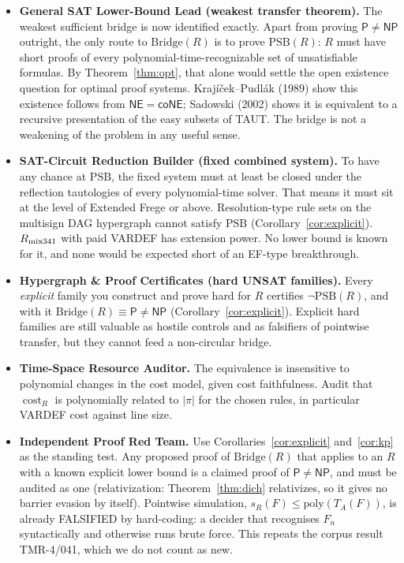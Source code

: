 \documentclass[11pt]{article}
\theoremstyle{definition}
\newcommand{\Pc}{\mathsf{P}}
\newcommand{\NP}{\mathsf{NP}}
\newcommand{\PSB}{\mathrm{PSB}}
\newcommand{\Bridge}{\mathrm{Bridge}}
\begin{document}
\begin{itemize}
\item \textbf{General SAT Lower-Bound Lead (weakest transfer theorem).}
The weakest sufficient bridge is now identified exactly. Apart from proving
$\Pc\ne\NP$ outright, the only route to $\Bridge(R)$ is to prove $\PSB(R)$:
$R$ must have short proofs of every polynomial-time-recognizable set of
unsatisfiable formulas. By Theorem~\ref{thm:opt}, that alone would settle the
open existence question for optimal proof systems. Krajíček--Pudlák (1989)
show this existence follows from $\mathsf{NE}=\mathsf{coNE}$; Sadowski (2002)
shows it is equivalent to a recursive presentation of the easy subsets of
TAUT. The bridge is not a weakening of the problem in any useful sense.
\item \textbf{SAT-Circuit Reduction Builder (fixed combined system).}
To have any chance at $\PSB$, the fixed system must at least be closed under the
reflection tautologies of every polynomial-time solver. That means it must sit
at the level of Extended Frege or above. Resolution-type rule sets on the
multisign DAG hypergraph cannot satisfy $\PSB$ (Corollary~\ref{cor:explicit}).
$R_{\rm mix341}$ with paid VARDEF has extension power. No lower bound is known
for it, and none would be expected short of an EF-type breakthrough.
\item \textbf{Hypergraph \& Proof Certificates (hard UNSAT families).}
Every \emph{explicit} family you construct and prove hard for $R$ certifies
$\neg\PSB(R)$, and with it $\Bridge(R)\equiv\Pc\ne\NP$
(Corollary~\ref{cor:explicit}). Explicit hard families are still valuable as
hostile controls and as falsifiers of pointwise transfer, but they cannot feed a
non-circular bridge.
\item \textbf{Time-Space Resource Auditor.}
The equivalence is insensitive to polynomial changes in the cost model, given
cost faithfulness. Audit that $\operatorname{cost}_R$ is polynomially related
to $|\pi|$ for the chosen rules, in particular VARDEF cost against line size.
\item \textbf{Independent Proof Red Team.}
Use Corollaries~\ref{cor:explicit} and~\ref{cor:kp} as the standing test. Any
proposed proof of $\Bridge(R)$ that applies to an $R$ with a known explicit
lower bound is a claimed proof of $\Pc\ne\NP$, and must be audited as one
(relativization: Theorem~\ref{thm:dich} relativizes, so it gives no barrier
evasion by itself). Pointwise simulation, $s_R(F)\le\mathrm{poly}(T_A(F))$, is
already FALSIFIED by hard-coding: a decider that recognises $F_n$ syntactically
and otherwise runs brute force. This repeats the corpus result TMR-4/041, which
we do not count as new.
\end{itemize}
\end{document}

